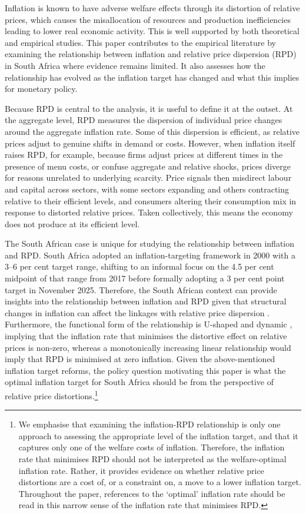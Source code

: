\documentclass[
  letterpaper,
  DIV=11,
  numbers=noendperiod]{scrartcl}
\begin{document}
Inflation is known to have adverse welfare effects through its
distortion of relative prices, which causes the misallocation of
resources and production inefficiencies leading to lower real economic
activity. This is well supported by both theoretical and empirical
studies. This paper contributes to the empirical literature by examining
the relationship between inflation and relative price dispersion (RPD)
in South Africa where evidence remains limited. It also assesses how the
relationship has evolved as the inflation target has changed and what
this implies for monetary policy.

Because RPD is central to the analysis, it is useful to define it at the
outset. At the aggregate level, RPD measures the dispersion of
individual price changes around the aggregate inflation rate. Some of
this dispersion is efficient, as relative prices adjust to genuine
shifts in demand or costs. However, when inflation itself raises RPD,
for example, because firms adjust prices at different times in the
presence of menu costs, or confuse aggregate and relative shocks, prices
diverge for reasons unrelated to underlying scarcity. Price signals then
misdirect labour and capital across sectors, with some sectors expanding
and others contracting relative to their efficient levels, and consumers
altering their consumption mix in response to distorted relative prices.
Taken collectively, this means the economy does not produce at its
efficient level.

The South African case is unique for studying the relationship between
inflation and RPD. South Africa adopted an inflation-targeting framework
in 2000 with a 3--6 per cent target range, shifting to an informal focus
on the 4.5 per cent midpoint of that range from 2017 before formally
adopting a 3 per cent point target in November 2025. Therefore, the
South African context can provide insights into the relationship between
inflation and RPD given that structural changes in inflation can affect
the linkages with relative price dispersion \citep{caglayan2003}.
Furthermore, the functional form of the relationship is U-shaped and
dynamic \citep{fielding2000, choi2010}, implying that the inflation rate
that minimises the distortive effect on relative prices is non-zero,
whereas a monotonically increasing linear relationship would imply that
RPD is minimised at zero inflation. Given the above-mentioned inflation
target reforms, the policy question motivating this paper is what the
optimal inflation target for South Africa should be from the perspective
of relative price distortions.\footnote{We emphasise that examining the
  inflation-RPD relationship is only one approach to assessing the
  appropriate level of the inflation target, and that it captures only
  one of the welfare costs of inflation. Therefore, the inflation rate
  that minimises RPD should not be interpreted as the welfare-optimal
  inflation rate. Rather, it provides evidence on whether relative price
  distortions are a cost of, or a constraint on, a move to a lower
  inflation target. Throughout the paper, references to the `optimal'
  inflation rate should be read in this narrow sense of the inflation
  rate that minimises RPD.}
\end{document}
